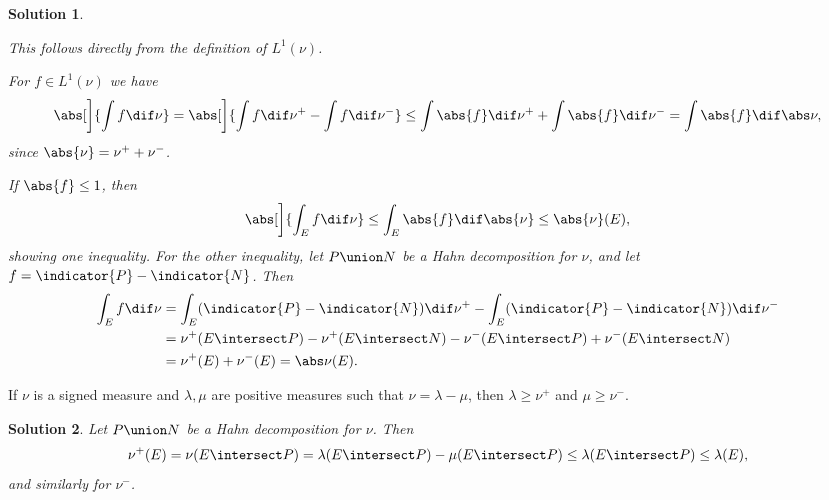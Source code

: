 \documentclass[article, a4paper, 11pt, oneside]{memoir}
\numberwithin{equation}{chapter}
\theoremstyle{nonumberplain}
\newtheorem{solution}{Solution}
\begin{document}
\begin{solution}
\begin{solutionsec}
	\item This follows directly from the definition of $L^1(\nu)$.
	
	\item For $f \in L^1(\nu)$ we have
	\begin{equation*}
		\abs[\bigg]{ \int f \dif\nu }
			= \abs[\bigg]{ \int f \dif\nu^+ - \int f \dif\nu^- }
			\leq \int \abs{f} \dif\nu^+ + \int \abs{f} \dif\nu^-
			= \int \abs{f} \dif\abs\nu,
	\end{equation*}
	since $\abs{\nu} = \nu^+ + \nu^-$.

	\item If $\abs{f} \leq 1$, then
	\begin{equation*}
		\abs[\bigg]{ \int_E f \dif\nu }
			\leq \int_E \abs{f} \dif\abs{\nu}
			\leq \abs{\nu}(E),
	\end{equation*}
	showing one inequality. For the other inequality, let $P \union N$ be a Hahn decomposition for $\nu$, and let $f = \indicator{P} - \indicator{N}$. Then
	\begin{align*}
		\int_E f \dif\nu
			&= \int_E (\indicator{P} - \indicator{N}) \dif\nu^+
			   - \int_E (\indicator{P} - \indicator{N}) \dif\nu^- \\
			&= \nu^+(E \intersect P) - \nu^+(E \intersect N)
			   - \nu^-(E \intersect P) + \nu^-(E \intersect N) \\
			&= \nu^+(E) + \nu^-(E)
			 = \abs\nu(E).
	\end{align*}
\end{solutionsec}
\end{solution}


\begin{exerciseframed*}[4]
	If $\nu$ is a signed measure and $\lambda, \mu$ are positive measures such that $\nu = \lambda - \mu$, then $\lambda \geq \nu^+$ and $\mu \geq \nu^-$.
\end{exerciseframed*}

\begin{solution}
	Let $P \union N$ be a Hahn decomposition for $\nu$. Then
	\begin{equation*}
		\nu^+(E)
			= \nu(E \intersect P)
			= \lambda(E \intersect P) - \mu(E \intersect P)
			\leq \lambda(E \intersect P)
			\leq \lambda(E),
	\end{equation*}
	and similarly for $\nu^-$.
\end{solution}
\end{document}
